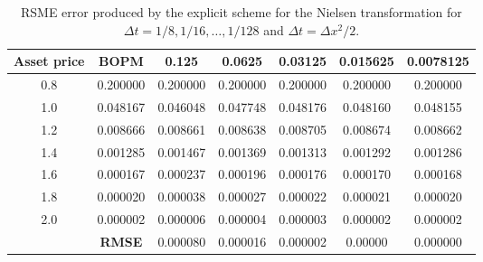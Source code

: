 \begin{table}[H]
    \centering
    \begin{tabular}{@{}ccccccc@{}}
    \toprule
    \textbf{Asset price} & \textbf{BOPM} & 0.125    & 0.0625   & 0.03125  & 0.015625 & 0.0078125 \\ \midrule
    0.8                  & 0.200000      & 0.200000 & 0.200000 & 0.200000 & 0.200000 & 0.200000  \\
    1.0                  & 0.048167      & 0.046048 & 0.047748 & 0.048176 & 0.048160 & 0.048155  \\
    1.2                  & 0.008666      & 0.008661 & 0.008638 & 0.008705 & 0.008674 & 0.008662  \\
    1.4                  & 0.001285      & 0.001467 & 0.001369 & 0.001313 & 0.001292 & 0.001286  \\
    1.6                  & 0.000167      & 0.000237 & 0.000196 & 0.000176 & 0.000170 & 0.000168  \\
    1.8                  & 0.000020      & 0.000038 & 0.000027 & 0.000022 & 0.000021 & 0.000020  \\
    2.0                  & 0.000002      & 0.000006 & 0.000004 & 0.000003 & 0.000002 & 0.000002  \\
                         & \textbf{RMSE} & 0.000080 & 0.000016 & 0.000002 & 0.00000  & 0.000000  \\ \bottomrule
    \end{tabular}
    \caption{\label{tab:rsme_explicit_nielsen_transformation}RSME error produced by the explicit scheme for the Nielsen transformation for $\Delta{t}=1/8,1/16,\dots,1/128$ and $\Delta{t}=\Delta{x}^2/2$.}
\end{table}

